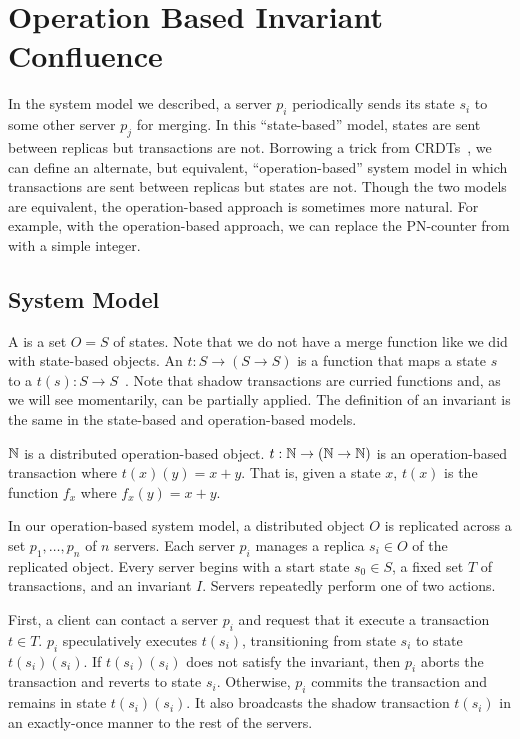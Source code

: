 \section{Operation Based Invariant Confluence}
In the system model we described, a server $p_i$ periodically sends its state
$s_i$ to some other server $p_j$ for merging. In this ``state-based'' model,
states are sent between replicas but transactions are not. Borrowing a trick
from CRDTs~\cite{shapiro2011conflict, shapiro2011comprehensive}, we can define
an alternate, but equivalent, ``operation-based'' system model in which
transactions are sent between replicas but states are not. Though the two
models are equivalent, the operation-based approach is sometimes more natural.
For example, with the operation-based approach, we can replace the PN-counter
from  with a simple integer.

\subsection{System Model}
A  is a set $O = S$ of states. Note
that we do not have a merge function like we did with state-based objects.
%
An  $t: S \to (S \to S)$ is a function
that maps a state $s$ to a  $t(s): S \to
S$~\cite{li2014automating}. Note that shadow transactions are curried functions
and, as we will see momentarily, can be partially applied.
%
The definition of an invariant is the same in the state-based and
operation-based models.

\begin{example}
  $\mathbb{N}$ is a distributed operation-based object. $t: \mathbb{N} \to (\mathbb{N} \to
  \mathbb{N})$ is an operation-based transaction where $t(x)(y) = x + y$. That is,
  given a state $x$, $t(x)$ is the function $f_x$ where $f_x(y) = x + y$.
\end{example}

In our operation-based system model, a distributed object $O$ is replicated
across a set $p_1, \ldots, p_n$ of $n$ servers. Each server $p_i$ manages a
replica $s_i \in O$ of the replicated object. Every server begins with a start
state $s_0 \in S$, a fixed set $T$ of transactions, and an invariant $I$.
Servers repeatedly perform one of two actions.

First, a client can contact a server $p_i$ and request that it execute a
transaction $t \in T$. $p_i$ speculatively executes $t(s_i)$, transitioning
from state $s_i$ to state $t(s_i)(s_i)$. If $t(s_i)(s_i)$ does not satisfy the
invariant, then $p_i$ aborts the transaction and reverts to state $s_i$.
Otherwise, $p_i$ commits the transaction and remains in state $t(s_i)(s_i)$. It
also broadcasts the shadow transaction $t(s_i)$ in an exactly-once manner to
the rest of the servers.

